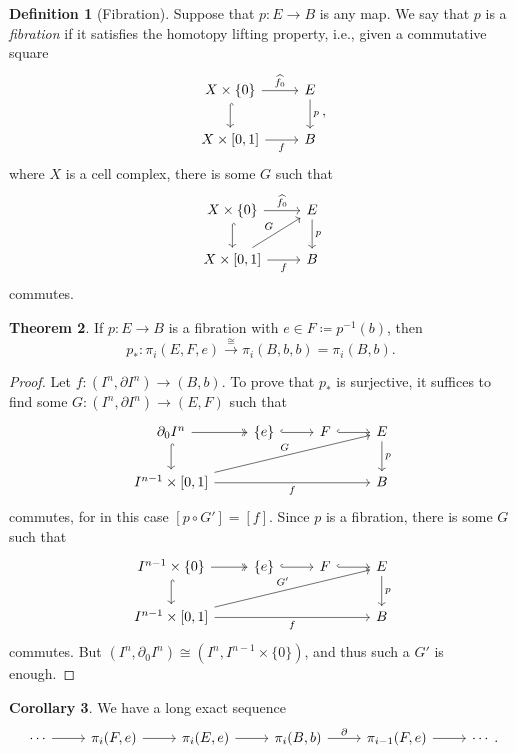 \documentclass[10pt,letterpaper,cm]{nupset}
\theoremstyle{definition}
\newtheorem{defn}{Definition}[subsection]
\theoremstyle{theorem}
\newtheorem{theorem}[defn]{Theorem}
\newtheorem{corollary}[defn]{Corollary}
\theoremstyle{remark}
\newcommand{\1}{\mathbb{1}}
\newcommand{\0}{\vec 0}
\begin{document}
\begin{defn}[Fibration]
Suppose that $p: E \to B$ is any map. We say that $p$ is a \textit{fibration} if it satisfies the homotopy lifting property, i.e., given a commutative square
\[
\begin{tikzcd}
X\times \{0\} \arrow[d, hook] \arrow[r, "\widehat{f_0}"] & E \arrow[d, "p"] \\
{X\times [0,1]} \arrow[r, "f"']                      & B               
\end{tikzcd}
,\]  where $X$ is a cell complex, there is some $G$ such that
\[
\begin{tikzcd}
X\times \{0\} \arrow[d, hook] \arrow[r, "\widehat{f_0}"] & E \arrow[d, "p"] \\
{X\times [0,1]} \arrow[r, "f"'] \arrow[ru, "G"]      & B               
\end{tikzcd}
\] commutes. 
\end{defn}

\begin{theorem}
If $p: E \to B$ is a fibration with $e \in F \coloneqq p^{-1}(b)$, then $$p_{\ast} : \pi_i(E, F, e) \overset{\cong}{\longrightarrow} \pi_i(B, b, b) = \pi_i(B, b).$$
\end{theorem}
\begin{proof}
Let $f: (I^n, \partial{I^n}) \to (B, b)$. To prove that $p_{\ast}$ is surjective, it suffices to find some $G : (I^n, \partial{I^n}) \to (E, F)$ such that 
\[
\begin{tikzcd}
\partial_0{I^n} \arrow[r, two heads] \arrow[d, hook]       & \{e\} \arrow[r, hook] & F \arrow[r, hook] & E \arrow[d, "p"] \\
{I^{n-1} \times [0,1]} \arrow[rrr, "f"'] \arrow[rrru, "G"] &                       &                   & B               
\end{tikzcd}
\] commutes, for in this case $[p \circ G'] = [f]$. Since $p$ is a fibration, there is some $G$ such that
\[
\begin{tikzcd}
I^{n-1} \times \{0\} \arrow[r, two heads] \arrow[d, hook]       & \{e\} \arrow[r, hook] & F \arrow[r, hook] & E \arrow[d, "p"] \\
{I^{n-1} \times [0,1]} \arrow[rrr, "f"'] \arrow[rrru, "G'"] &                       &                   & B               
\end{tikzcd}
\] 
commutes. But $(I^n, \partial_0{I^n}) \cong (I^n, I^{n-1} \times \{0\})$, and thus such a $G'$ is enough. 
\end{proof}

\begin{corollary}\label{exhtpy}
We have a long exact sequence 
\[
\begin{tikzcd}
\cdots \arrow[r] & {\pi_i(F, e)} \arrow[r] & {\pi_i(E, e)} \arrow[r] & {\pi_i(B, b)} \arrow[r, "\partial"] & {\pi_{i-1}(F, e)} \arrow[r] & \cdots
\end{tikzcd}
.\]
\end{corollary}
\end{document}
